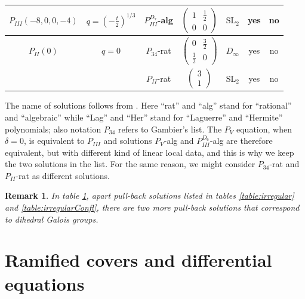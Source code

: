 \documentclass[12]{amsart}
\newtheorem{remark}[thm]{Remark}
\newcommand{\SL}{\mathrm{SL}_2}
\begin{document}
\begin{table}[h]
\begin{center}
\begin{tabular}{|c|c|c|c|c|c|c|}
\hline
 $P_{III}\left(-8,0,0,-4\right)$ & $q=\left(-\frac{t}{2}\right)^{1/3}$ & $P_{III}^{D_7}$-alg & $\begin{pmatrix}1&\frac{1}{2}\\ 0&0\end{pmatrix}$ & $\SL$ & yes & no \\
\hline
 $P_{II}\left(0\right)$ & $q=0$ & $P_{34}$-rat & $\begin{pmatrix}0&\frac{3}{2}\\ \frac{1}{2}&0\end{pmatrix}$ 
 & $D_\infty$ & yes & no \\
&& $P_{II}$-rat & $\begin{pmatrix}3\\ 1\end{pmatrix}$ & $\SL$ & yes & no \\
\hline
\end{tabular}
\end{center}
\label{table:AlgSolPainleve}
\end{table}

The name of solutions follows from \cite{OO}. Here ``rat'' and ``alg'' stand for ``rational'' and ``algebraic''
while ``Lag'' and ``Her'' stand for ``Laguerre'' and ``Hermite'' polynomials; also notation $P_{34}$ refers to Gambier's list.
The $P_V$ equation, when $\delta=0$, is equivalent to $P_{III}$ and solutions $P_{V}$-alg and $P_{III}^{D_6}$-alg
are therefore equivalent, but with different kind of linear local data, and this is why we keep the two solutions in the list.
For the same reason, we might consider $P_{34}$-rat and $P_{II}$-rat as different solutions.


\begin{remark}In table \ref{table:AlgSolPainleve}, apart pull-back solutions listed in tables
\ref{table:irregular} and \ref{table:irregularConfl}, there are two more pull-back solutions 
that correspond to dihedral Galois groups.  
\end{remark}

\section{Ramified covers and differential equations}\label{sec:RamifiedCovers}
\end{document}
